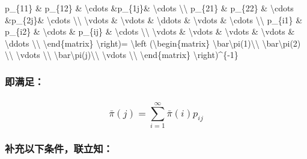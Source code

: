 \documentclass[11pt]{article}
\begin{document}
{{        p\_\{11\} \& p\_\{12\} \& \textbackslash{}cdots \&p\_\{1j\}\& \textbackslash{}cdots  \textbackslash{}\textbackslash{}
        p\_\{21\}  \& p\_\{22\} \& \textbackslash{}cdots \&p\_\{2j\}\& \textbackslash{}cdots \textbackslash{}\textbackslash{}
        \textbackslash{}vdots \& \textbackslash{}vdots \& \textbackslash{}ddots \& \textbackslash{}vdots \& \textbackslash{}cdots \textbackslash{}\textbackslash{}
        p\_\{i1\} \& p\_\{i2\} \& \textbackslash{}cdots \& p\_\{ij\} \& \textbackslash{}cdots \textbackslash{}\textbackslash{}
        \textbackslash{}vdots \& \textbackslash{}vdots \& \textbackslash{}vdots \& \textbackslash{}vdots \& \textbackslash{}ddots \textbackslash{}\textbackslash{}
        \textbackslash{}end\{matrix\} \textbackslash{}right)=
         \textbackslash{}left (\textbackslash{}begin\{matrix\}
        \textbackslash{}bar\textbackslash{}pi(1)\textbackslash{}\textbackslash{} \textbackslash{}bar\textbackslash{}pi(2) \textbackslash{}\textbackslash{} \textbackslash{}vdots \textbackslash{}\textbackslash{} \textbackslash{}bar\textbackslash{}pi(j)\textbackslash{}\textbackslash{} \textbackslash{}vdots  \textbackslash{}\textbackslash{}
        \textbackslash{}end\{matrix\} \textbackslash{}right)\^{}\{-1\}
        }}\label{left-beginmatrix-barpi1-barpi2-vdots-barpij-vdots-endmatrix-right-1-left-beginmatrix-p_11-p_12-cdots-p_1j-cdots-p_21-p_22-cdots-p_2j-cdots-vdots-vdots-ddots-vdots-cdots-p_i1-p_i2-cdots-p_ij-cdots-vdots-vdots-vdots-vdots-ddots-endmatrix-right-left-beginmatrix-barpi1-barpi2-vdots-barpij-vdots-endmatrix-right-1}

\subsubsection{即满足：}\label{ux5373ux6ee1ux8db3}

\subsubsection{\texorpdfstring{\[\bar\pi(j)=\sum_{i=1}^{\infty} \bar\pi(i)p_{ij}\]}{\textbackslash{}bar\textbackslash{}pi(j)=\textbackslash{}sum\_\{i=1\}\^{}\{\textbackslash{}infty\} \textbackslash{}bar\textbackslash{}pi(i)p\_\{ij\}}}\label{barpijsum_i1infty-barpiip_ij}

\subsubsection{补充以下条件，联立知：}\label{ux8865ux5145ux4ee5ux4e0bux6761ux4ef6ux8054ux7acbux77e5}
\end{document}
